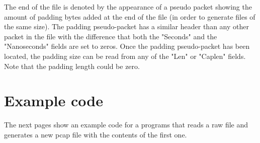 \documentclass{article}
\begin{document}
The end of the file is denoted by the appearance of a pseudo packet showing the amount of padding bytes added at the end of the file (in order to generate files of the same size).
The padding pseudo-packet has a similar header than any other packet in the file with the difference that both the "Seconds" and the "Nanoseconds" fields are set to zeros.
Once the padding pseudo-packet has been located, the padding size can be read from any of the "Len" or "Caplen" fields. Note that the padding length could be zero.


\section{Example code}

The next pages show an example code for a programs that reads a raw file and generates a new pcap file with the contents of the first one.

%



\end{document}
